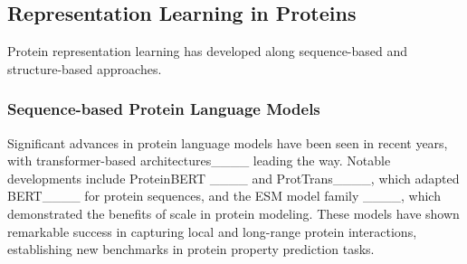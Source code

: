


\subsection{Representation Learning in Proteins}
Protein representation learning has developed along sequence-based and structure-based approaches.

\subsubsection{Sequence-based Protein Language Models}
Significant advances in protein language models have been seen in recent years, with transformer-based architectures____ leading the way. Notable developments include ProteinBERT ____ and ProtTrans____, which adapted BERT____ for protein sequences, and the ESM model family ____, which demonstrated the benefits of scale in protein modeling. These models have shown remarkable success in capturing local and long-range protein interactions, establishing new benchmarks in protein property prediction tasks.

